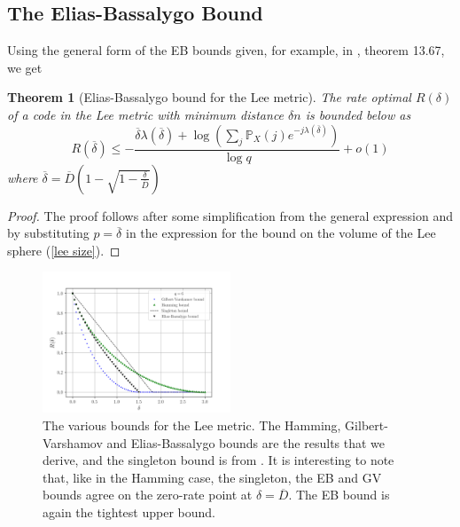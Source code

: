 \documentclass[conference,letterpaper]{IEEEtran}
\newtheorem{theorem}{Theorem}
\newtheorem{lemma}[theorem]{Lemma}
\begin{document}
\subsection{The Elias-Bassalygo Bound}

Using the general form of the EB bounds given, for example, in \cite{Berlekamp:2015:ACT:2834146}, theorem 13.67, we get
\begin{theorem}[Elias-Bassalygo bound for the Lee metric] The rate optimal $R(\delta)$ of a code in the Lee metric with minimum distance $\delta n$ is bounded below as
\begin{equation}
    R(\overline{\delta}) \leq -\frac{{\overline{\delta}} \lambda(\overline{\delta}) + \log \left(\sum_j \mathbb{P}_X(j) e^{-j \lambda(\overline{\delta})}\right)}{\log q} + o(1)
\end{equation}
where $\overline{\delta} = \overline{D}\left(1 - \sqrt{1 - \frac{\delta}{\overline{D}}}\right)$
\end{theorem}

\begin{proof}
The proof follows after some simplification from the general expression and by substituting $p = \overline{\delta}$ in the expression for the bound on the volume of the Lee sphere (\cref{lee size}).
\end{proof}


\begin{figure}[htbp]
    \centering
    \includegraphics[width=0.5\textwidth]{bounds}
    \caption{The various bounds for the Lee metric. The Hamming, Gilbert-Varshamov and Elias-Bassalygo bounds are the results that we derive, and the singleton bound is from \cite{lee}. It is interesting to note that, like in the Hamming case, the singleton, the EB and GV bounds agree on the zero-rate point at $\delta = \overline{D}$. The EB bound is again the tightest upper bound.}
\end{figure}
\end{document}
